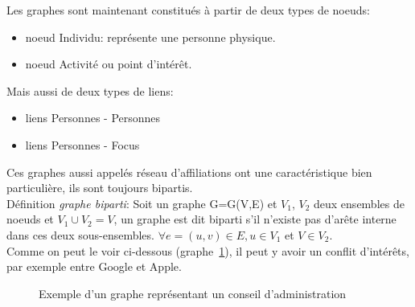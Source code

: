 Les graphes sont maintenant constitués à partir de deux types de noeuds:
\begin{itemize}
\item noeud Individu: représente une personne physique.
\item noeud Activité ou point d'intérêt. \\
\end{itemize}

Mais aussi de deux types de liens:
\begin{itemize}
\item liens Personnes - Personnes
\item liens Personnes - Focus
\end{itemize}

Ces graphes aussi appelés réseau d'affiliations ont une caractéristique bien particulière, ils sont toujours bipartis.\\

Définition \textit{graphe biparti}: Soit un graphe G=G(V,E) et $V_{1}$, $V_{2}$ deux ensembles de noeuds et $ V_{1} \cup V_{2} = V $, un graphe est dit biparti s'il n'existe pas d'arête interne dans ces deux sous-ensembles. $ \forall e = (u,v)\in E, u \in V_{1}$ et $V \in V_{2} $.\\

Comme on peut le voir ci-dessous (graphe~\ref{graph:grapheGoogle}), il peut y avoir un conflit d'intérêts, par exemple entre Google et Apple.

\begin{figure}[h!]
\centering
{}
\caption{Exemple d'un graphe représentant un conseil d'administration}

\label{graph:grapheGoogle}
\end{figure}


